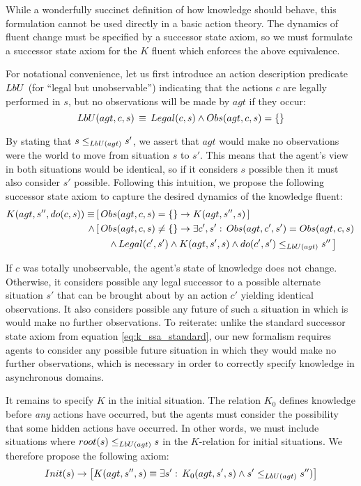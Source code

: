 While a wonderfully succinct definition of how knowledge should behave,
this formulation cannot be used directly in a basic action theory.
The dynamics of fluent change must be specified by a successor state
axiom, so we must formulate a successor state axiom for the $K$ fluent
which enforces the above equivalence.

For notational convenience, let us first introduce an action description
predicate $LbU$ (for {}``legal but unobservable'') indicating
that the actions $c$ are legally performed in $s$, but no observations
will be made by $agt$ if they occur:\begin{equation}
LbU(agt,c,s)\,\equiv\, Legal(c,s)\wedge Obs(agt,c,s)=\{\}\label{eqn:LbU_defn}\end{equation}


By stating that $s\leq_{LbU(agt)}s'$, we assert that $agt$ would
make no observations were the world to move from situation $s$ to
$s'$. This means that the agent's view in both situations would be
identical, so if it considers $s$ possible then it must also consider
$s'$ possible. Following this intuition, we propose the following
successor state axiom to capture the desired dynamics of the knowledge
fluent:\begin{align}
K(agt,s'',do(c,s))\equiv & \left[\, Obs(agt,c,s)=\{\}\rightarrow K(agt,s'',s)\,\right]\nonumber \\
\wedge & \left[\, Obs(agt,c,s)\neq\{\}\rightarrow\exists c',s':\, Obs(agt,c',s')=Obs(agt,c,s)\right.\nonumber \\
 & \left.\,\,\,\,\,\,\,\,\wedge\, Legal(c',s')\wedge K(agt,s',s)\wedge do(c',s')\leq_{LbU(agt)}s''\,\right]\label{eqn:new_k_ssa}\end{align}


If $c$ was totally unobservable, the agent's state of knowledge does
not change. Otherwise, it considers possible any legal successor to
a possible alternate situation $s'$ that can be brought about by
an action $c'$ yielding identical observations. It also considers
possible any future of such a situation in which is would make no
further observations. To reiterate: unlike the standard successor
state axiom from equation \eqref{eq:k_ssa_standard}, our new formalism
requires agents to consider any possible future situation in which
they would make no further observations, which is necessary in order
to correctly specify knowledge in asynchronous domains.

It remains to specify $K$ in the initial situation. The relation
$K_{0}$ defines knowledge before \emph{any} actions have occurred,
but the agents must consider the possibility that some hidden actions
have occurred. In other words, we must include situations where $root(s)\leq_{LbU(agt)}s$
in the $K$-relation for initial situations. We therefore propose
the following axiom:\begin{gather}
Init(s)\rightarrow\left[K(agt,s'',s)\equiv\exists s':\, K_{0}(agt,s',s)\wedge s'\leq_{LbU(agt)}s'')\right]\label{eqn:new_k_s0}\end{gather}

